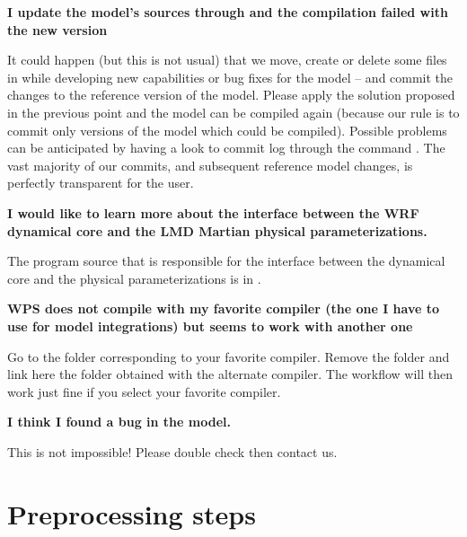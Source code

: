 \sk
\noindent \textbf{I update the model's sources through  and the compilation failed with the new version}
\begin{finger}
\item It could happen (but this is not usual) that we move, create or delete some files in  while developing new capabilities or bug fixes for the model -- and commit the changes to the reference version of the model. Please apply the solution proposed in the previous point and the model can be compiled again (because our rule is to commit only versions of the model which could be compiled). Possible problems can be anticipated by having a look to commit log through the command . The vast majority of our commits, and subsequent reference model changes, is perfectly transparent for the user.
\end{finger}

\sk
\noindent \textbf{I would like to learn more about the interface between the WRF dynamical core and the LMD Martian physical parameterizations.}
\begin{finger}
\item The program source that is responsible for the interface between the dynamical core and the physical parameterizations is  in .
\end{finger}

\sk
\noindent \textbf{WPS does not compile with my favorite compiler (the one I have to use for model integrations) but seems to work with another one}
\begin{finger}
\item Go to the folder corresponding to your favorite compiler. Remove the  folder and link here the  folder obtained with the alternate compiler. The  workflow will then work just fine if you select your favorite compiler.
\end{finger}

\sk
\noindent \textbf{I think I found a bug in the model.}
\begin{finger}
\item This is not impossible! Please double check then contact us.
\end{finger}

\mk
\section{Preprocessing steps}

